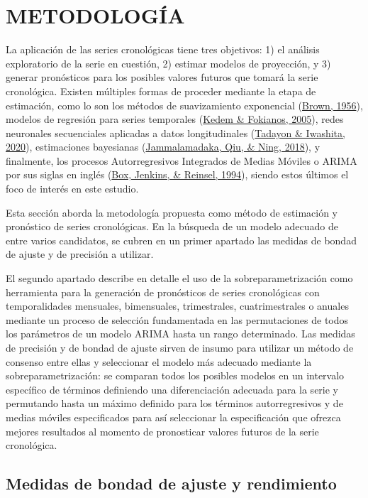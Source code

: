 \documentclass[
]{article}
\begin{document}
\newpage

\section{METODOLOGÍA}

La aplicación de las series cronológicas tiene tres objetivos: 1) el
análisis exploratorio de la serie en cuestión, 2) estimar modelos de
proyección, y 3) generar pronósticos para los posibles valores futuros
que tomará la serie cronológica. Existen múltiples formas de proceder
mediante la etapa de estimación, como lo son los métodos de
suavizamiento exponencial (\protect\hyperlink{ref-brown}{Brown, 1956}),
modelos de regresión para series temporales
(\protect\hyperlink{ref-kedem}{Kedem \& Fokianos, 2005}), redes
neuronales secuenciales aplicadas a datos longitudinales
(\protect\hyperlink{ref-redes}{Tadayon \& Iwashita, 2020}), estimaciones
bayesianas (\protect\hyperlink{ref-bayes}{Jammalamadaka, Qiu, \& Ning,
2018}), y finalmente, los procesos Autorregresivos Integrados de Medias
Móviles o ARIMA por sus siglas en inglés
(\protect\hyperlink{ref-box-jenkins}{Box, Jenkins, \& Reinsel, 1994}),
siendo estos últimos el foco de interés en este estudio.

Esta sección aborda la metodología propuesta como método de estimación y
pronóstico de series cronológicas. En la búsqueda de un modelo adecuado
de entre varios candidatos, se cubren en un primer apartado las medidas
de bondad de ajuste y de precisión a utilizar.

El segundo apartado describe en detalle el uso de la
sobreparametrización como herramienta para la generación de pronósticos
de series cronológicas con temporalidades mensuales, bimensuales,
trimestrales, cuatrimestrales o anuales mediante un proceso de selección
fundamentada en las permutaciones de todos los parámetros de un modelo
ARIMA hasta un rango determinado. Las medidas de precisión y de bondad
de ajuste sirven de insumo para utilizar un método de consenso entre
ellas y seleccionar el modelo más adecuado mediante la
sobreparametrización: se comparan todos los posibles modelos en un
intervalo específico de términos definiendo una diferenciación adecuada
para la serie y permutando hasta un máximo definido para los términos
autorregresivos y de medias móviles especificados para así seleccionar
la especificación que ofrezca mejores resultados al momento de
pronosticar valores futuros de la serie cronológica.

\subsection{Medidas de bondad de ajuste y rendimiento}
\end{document}
